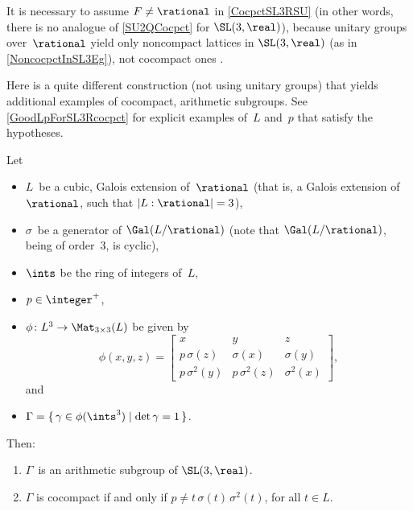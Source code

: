  \begin{rem}
 It is necessary to assume $F \neq \rational$ in \cref{CocpctSL3RSU} (in other words, there is no analogue of \cref{SU2QCocpct} for $\SL(3,\real)$), because unitary groups over~$\rational$ yield only noncompact lattices in $\SL(3,\real)$ (as in \cref{NoncocpctInSL3Eg}), not cocompact ones .
 \end{rem}

Here is a quite different construction (not using unitary groups) that yields additional examples of cocompact, arithmetic subgroups. See
\cref{GoodLpForSL3Rcocpct} for explicit examples of~$L$
and~$p$ that satisfy the hypotheses.

\begin{prop} \label{CocpctSL3Rbands}
 Let
 \begin{itemize}
 \item $L$~be a cubic, Galois extension of~$\rational$
\textup(that is, a Galois extension of~$\rational$, such
that $|L:\rational| = 3$\textup),
 \item $\sigma$~be a generator of $\Gal(L/\rational)$
\textup(note that $\Gal(L/\rational)$, being of
order~$3$, is cyclic\textup),
 \item $\ints$ be the ring of integers of~$L$,
 \item $p \in \integer^+$,
 \item $\phi \colon L^3 \to \Mat_{3 \times 3}(L)$ be given
by
 \begin{equation} \label{embedDcyclic}
 \phi(x,y,z) =
 \begin{bmatrix}
 x & y & z \\
 p \, \sigma(z) & \sigma(x) & \sigma(y) \\
 p \, \sigma^2(y) & p \, \sigma^2(z) & \sigma^2(x)
 \end{bmatrix}
 ,
 \end{equation}
 and
 \item $\Gamma = \{\, \gamma \in \phi(\ints^3) \mid
\det \gamma = 1 \,\}$.
 \end{itemize}
 Then:
 \begin{enumerate}
 \item  \label{CocpctSL3Rbands-latt}
 $\Gamma$~is an arithmetic subgroup of\/ $\SL(3,\real)$.
 \item \label{CocpctSL3Rbands-cocpct}
 $\Gamma$ is cocompact if and only if $p \neq t \,
\sigma(t) \, \sigma^2(t)$, for all $t \in L$.
 \end{enumerate}
 \end{prop}

